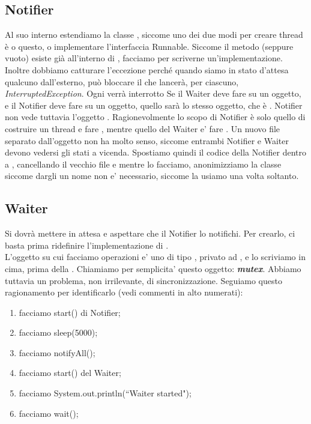 \subsection{Notifier}
Al suo interno estendiamo la classe , siccome uno dei due modi per creare thread è o
questo, o implementare l'interfaccia Runnable. Siccome il metodo  (seppure vuoto) esiste
già all'interno di , facciamo  per scriverne un'implementazione.
%
\newline
\newline
%
Inoltre dobbiamo catturare l'eccezione perché quando siamo in stato d'attesa qualcuno dall'esterno, può bloccare il  che lancerà, per ciascuno, \emph{InterruptedException}.
Ogni  verrà interrotto
%
\newline
\newline
%
Se il Waiter deve fare  su un oggetto, e il Notifier deve fare  su un
oggetto, quello sarà lo stesso oggetto, che è .
Notifier non vede tuttavia l'oggetto . 
Ragionevolmente lo scopo di Notifier è solo quello di costruire un thread e fare ,
mentre quello del Waiter e' fare .
Un nuovo file separato dall'oggetto  non ha molto senso, siccome entrambi Notifier
e Waiter devono vedersi gli stati a vicenda.
Spostiamo quindi il codice della Notifier dentro a , cancellando il vecchio file e
mentre lo facciamo, anonimizziamo la classe siccome dargli un nome non e' necessario, siccome
la usiamo una volta soltanto.

\subsection{Waiter}
Si dovrà mettere in attesa e aspettare che il Notifier lo notifichi.
Per crearlo, ci basta prima ridefinire l'implementazione di . \\
L'oggetto su cui facciamo operazioni e' uno di tipo , privato ad , e lo scriviamo
in cima, prima della . Chiamiamo per semplicita' questo oggetto: \textbf{\emph{mutex}}.
%
\newline
\newline
%
Abbiamo tuttavia un problema, non irrilevante, di sincronizzazione. 
Seguiamo questo ragionamento per identificarlo (vedi commenti in alto numerati):
\begin{enumerate}
    \item facciamo start() di Notifier;
    \item facciamo sleep(5000);
    \item facciamo notifyAll();
    \item facciamo start() del Waiter;
    \item facciamo System.out.println(``Waiter started");
    \item facciamo wait();
\end{enumerate}

